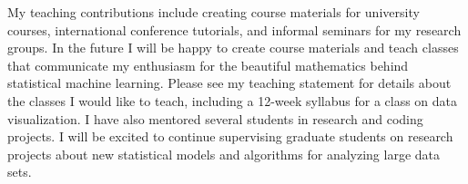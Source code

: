 \documentclass{article}
\begin{document}


My teaching contributions include creating course materials for
university courses, international conference tutorials, and informal
seminars for my research groups. In the future I will be happy to
create course materials and teach classes that communicate my
enthusiasm for the beautiful mathematics behind statistical machine
learning. Please
see my teaching statement for details about the
classes I would like to teach, including a 12-week syllabus for a class on data visualization. I have also mentored several students
in research and coding projects. I will be excited to continue
supervising graduate students on research projects about new
statistical models and algorithms for analyzing large 
data
sets. 

\end{document}
